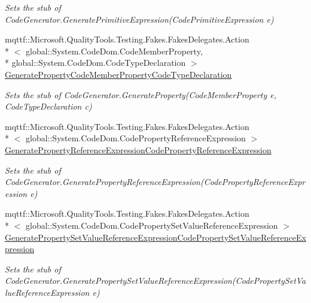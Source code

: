 \begin{DoxyCompactItemize}
\begin{DoxyCompactList}\small\item\em Sets the stub of Code\-Generator.\-Generate\-Primitive\-Expression(\-Code\-Primitive\-Expression e)\end{DoxyCompactList}\item 
mqttf\-::\-Microsoft.\-Quality\-Tools.\-Testing.\-Fakes.\-Fakes\-Delegates.\-Action\\*
$<$ global\-::\-System.\-Code\-Dom.\-Code\-Member\-Property, \\*
global\-::\-System.\-Code\-Dom.\-Code\-Type\-Declaration $>$ \hyperlink{class_system_1_1_code_dom_1_1_compiler_1_1_fakes_1_1_stub_code_compiler_a3fc19bb8965e46f5bbbaba5df57ea634}{Generate\-Property\-Code\-Member\-Property\-Code\-Type\-Declaration}
\begin{DoxyCompactList}\small\item\em Sets the stub of Code\-Generator.\-Generate\-Property(\-Code\-Member\-Property e, Code\-Type\-Declaration c)\end{DoxyCompactList}\item 
mqttf\-::\-Microsoft.\-Quality\-Tools.\-Testing.\-Fakes.\-Fakes\-Delegates.\-Action\\*
$<$ global\-::\-System.\-Code\-Dom.\-Code\-Property\-Reference\-Expression $>$ \hyperlink{class_system_1_1_code_dom_1_1_compiler_1_1_fakes_1_1_stub_code_compiler_a17109d0ccc81d8596ad773e835bc8c92}{Generate\-Property\-Reference\-Expression\-Code\-Property\-Reference\-Expression}
\begin{DoxyCompactList}\small\item\em Sets the stub of Code\-Generator.\-Generate\-Property\-Reference\-Expression(\-Code\-Property\-Reference\-Expression e)\end{DoxyCompactList}\item 
mqttf\-::\-Microsoft.\-Quality\-Tools.\-Testing.\-Fakes.\-Fakes\-Delegates.\-Action\\*
$<$ global\-::\-System.\-Code\-Dom.\-Code\-Property\-Set\-Value\-Reference\-Expression $>$ \hyperlink{class_system_1_1_code_dom_1_1_compiler_1_1_fakes_1_1_stub_code_compiler_ac2001ad923c57b59f9a43cb1059e6e47}{Generate\-Property\-Set\-Value\-Reference\-Expression\-Code\-Property\-Set\-Value\-Reference\-Expression}
\begin{DoxyCompactList}\small\item\em Sets the stub of Code\-Generator.\-Generate\-Property\-Set\-Value\-Reference\-Expression(\-Code\-Property\-Set\-Value\-Reference\-Expression e)\end{DoxyCompactList}\item 

\end{DoxyCompactItemize}
